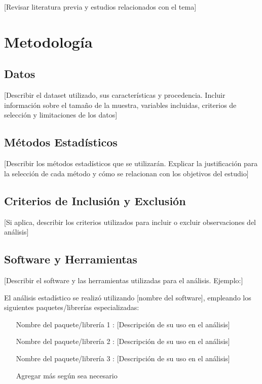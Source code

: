\documentclass[12pt, letterpaper]{article}
\begin{document}
[Revisar literatura previa y estudios relacionados con el tema]

\section{Metodología}

\subsection{Datos}

[Describir el dataset utilizado, sus características y procedencia. Incluir información sobre el tamaño de la muestra, variables incluidas, criterios de selección y limitaciones de los datos]

\subsection{Métodos Estadísticos}

[Describir los métodos estadísticos que se utilizarán. Explicar la justificación para la selección de cada método y cómo se relacionan con los objetivos del estudio]

\subsection{Criterios de Inclusión y Exclusión}

[Si aplica, describir los criterios utilizados para incluir o excluir observaciones del análisis]

\subsection{Software y Herramientas}

[Describir el software y las herramientas utilizadas para el análisis. Ejemplo:]

El análisis estadístico se realizó utilizando [nombre del software], empleando los siguientes paquetes/librerías especializadas:

\begin{itemize}
    \item [Nombre del paquete/librería 1]: [Descripción de su uso en el análisis]
    \item [Nombre del paquete/librería 2]: [Descripción de su uso en el análisis]
    \item [Nombre del paquete/librería 3]: [Descripción de su uso en el análisis]
    \item [Agregar más según sea necesario]
\end{itemize}
\end{document}
